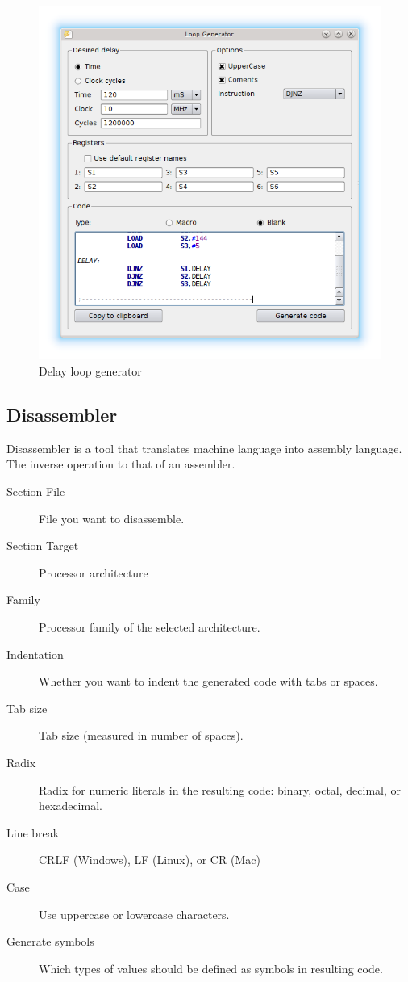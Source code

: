         \enlargethispage{6\baselineskip}
        \begin{figure}[h]
            \centering
            \includegraphics[width=.6\textwidth]{img/loop_gen.png}
            \caption{Delay loop generator}
        \end{figure}

    \clearpage
    \subsection{Disassembler}
        Disassembler is a tool that translates machine language into assembly language. The inverse operation to that of an assembler.

        \begin{description}
            \item[Section File] File you want to disassemble.
            \item[Section Target] Processor architecture
            \item[Family] Processor family of the selected architecture.
            \item[Indentation] Whether you want to indent the generated code with tabs or spaces.
            \item[Tab size] Tab size (measured in number of spaces).
            \item[Radix] Radix for numeric literals in the resulting code: binary, octal, decimal, or hexadecimal.
            \item[Line break] CRLF (Windows), LF (Linux), or CR (Mac)
            \item[Case] Use uppercase or lowercase characters.
            \item[Generate symbols] Which types of values should be defined as symbols in resulting code.
        \end{description}

